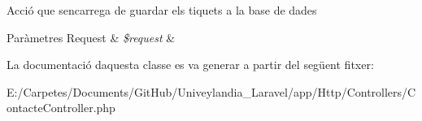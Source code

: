 Acció que s\textquotesingle{}encarrega de guardar els tiquets a la base de dades 
\begin{DoxyParams}[1]{Paràmetres}
Request & {\em \$request} & \\
\hline
\end{DoxyParams}


La documentació d\textquotesingle{}aquesta classe es va generar a partir del següent fitxer\+:\begin{DoxyCompactItemize}
\item 
E\+:/\+Carpetes/\+Documents/\+Git\+Hub/\+Univeylandia\+\_\+\+Laravel/app/\+Http/\+Controllers/Contacte\+Controller.\+php\end{DoxyCompactItemize}
